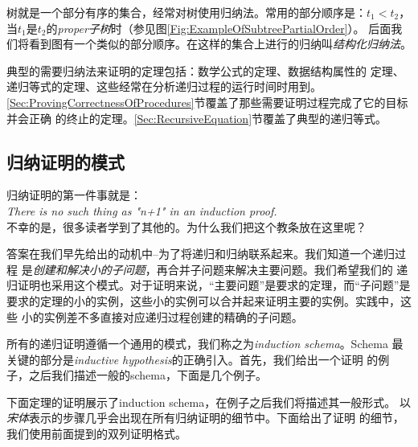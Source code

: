 \begin{figure*}[!t]
    \caption{展示的树的集合之间的\emph{subtree partial order}}
    \label{Fig:ExampleOfSubtreePartialOrder}
\end{figure*}

树就是一个部分有序的集合，经常对树使用归纳法。常用的部分顺序是：$t_1<t_2$，
当$t_1$是$t_2$的\emph{proper子树}时（参见图\ref{Fig:ExampleOfSubtreePartialOrder}）。
后面我们将看到图有一个类似的部分顺序。在这样的集合上进行的归纳叫\emph{结构化归纳法}。

典型的需要归纳法来证明的定理包括：数学公式的定理、数据结构属性的
定理、递归等式的定理、这些经常在分析递归过程的运行时间时用到。
\ref{Sec:ProvingCorrectnessOfProcedures}节覆盖了那些需要证明过程完成了它的目标并会正确
的终止的定理。\ref{Sec:RecursiveEquation}节覆盖了典型的递归等式。

\subsection{归纳证明的模式}\label{Sec:PatternOfInductionProof}
归纳证明的第一件事就是：\\
\indent\emph{There is no such thing as "n+1" in an induction proof.}\\
不幸的是，很多读者学到了其他的。为什么我们把这个教条放在这里呢？

答案在我们早先给出的动机中--为了将递归和归纳联系起来。我们知道一个递归过程
是\emph{创建和解决小的子问题}，再合并子问题来解决主要问题。我们希望我们的
递归证明也采用这个模式。对于证明来说，“主要问题”是要求的定理，而“子问题”是
要求的定理的小的实例，这些小的实例可以合并起来证明主要的实例。实践中，这些
小的实例差不多直接对应递归过程创建的精确的子问题。

所有的递归证明遵循一个通用的模式，我们称之为\emph{induction schema}。Schema
最关键的部分是\emph{inductive hypothesis}的正确引入。首先，我们给出一个证明
的例子，之后我们描述一般的schema，下面是几个例子。

\begin{example}
下面定理的证明展示了induction schema，在例子之后我们将描述其一般形式。
以\emph{宋体}表示的步骤几乎会出现在所有归纳证明的细节中。下面给出了证明
的细节，我们使用前面提到的双列证明格式。
\end{example}

